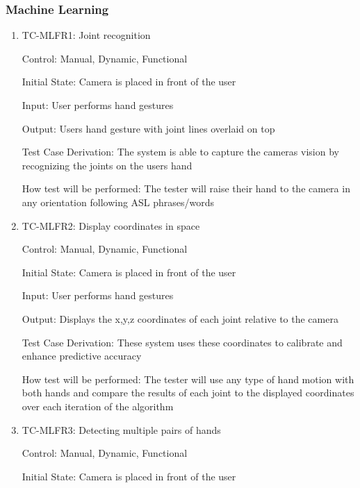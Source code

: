\documentclass[12pt]{article}
\begin{document}
\subsubsection{Machine Learning}
  
\begin{enumerate}
  
\item{TC-MLFR1: Joint recognition\\}
  
Control: Manual, Dynamic, Functional
              
Initial State: Camera is placed in front of the user
              
Input: User performs hand gestures
              
Output: User\textquotesingle s hand gesture with joint lines overlaid on top
    
Test Case Derivation: The system is able to capture the camera\textquotesingle s vision by recognizing the joints on the user\textquotesingle s hand 
    
How test will be performed: The tester will raise their hand to the camera in any orientation following ASL phrases/words
  
\item{TC-MLFR2: Display coordinates in space\\}
  
Control: Manual, Dynamic, Functional
              
Initial State: Camera is placed in front of the user
              
Input: User performs hand gestures
              
Output: Displays the x,y,z coordinates of each joint relative to the camera
    
Test Case Derivation: These system uses these coordinates to calibrate and enhance predictive accuracy
    
How test will be performed: The tester will use any type of hand motion with both hands and compare the results of each joint to the displayed coordinates over each iteration of the algorithm
  
\item{TC-MLFR3: Detecting multiple pairs of hands\\}
  
Control: Manual, Dynamic, Functional
              
Initial State: Camera is placed in front of the user
              

\end{enumerate}
\end{document}
